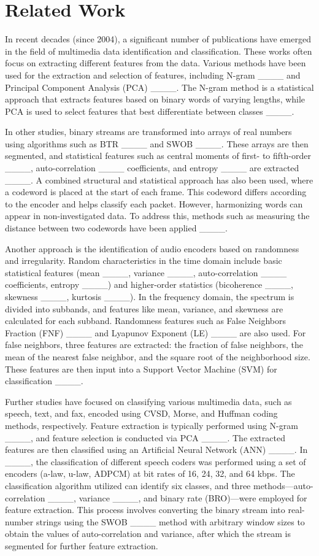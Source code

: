 \section{Related Work}
In recent decades (since 2004), a significant number of publications have emerged in the field of multimedia data identification and classification. These works often focus on extracting different features from the data. Various methods have been used for the extraction and selection of features, including N-gram ____ and Principal Component Analysis (PCA) ____. The N-gram method is a statistical approach that extracts features based on binary words of varying lengths, while PCA is used to select features that best differentiate between classes ____.

In other studies, binary streams are transformed into arrays of real numbers using algorithms such as BTR ____ and SWOB ____. These arrays are then segmented, and statistical features such as central moments of first- to fifth-order ____, auto-correlation ____ coefficients, and entropy ____ are extracted ____. A combined structural and statistical approach has also been used, where a codeword is placed at the start of each frame. This codeword differs according to the encoder and helps classify each packet. However, harmonizing words can appear in non-investigated data. To address this, methods such as measuring the distance between two codewords have been applied ____.

Another approach is the identification of audio encoders based on randomness and irregularity. Random characteristics in the time domain include basic statistical features (mean ____, variance ____, auto-correlation ____ coefficients, entropy ____) and higher-order statistics (bicoherence ____, skewness ____, kurtosis ____). In the frequency domain, the spectrum is divided into subbands, and features like mean, variance, and skewness are calculated for each subband. Randomness features such as False Neighbors Fraction (FNF) ____ and Lyapunov Exponent (LE) ____ are also used. For false neighbors, three features are extracted: the fraction of false neighbors, the mean of the nearest false neighbor, and the square root of the neighborhood size. These features are then input into a Support Vector Machine (SVM) for classification ____.

Further studies have focused on classifying various multimedia data, such as speech, text, and fax, encoded using CVSD, Morse, and Huffman coding methods, respectively. Feature extraction is typically performed using N-gram ____, and feature selection is conducted via PCA ____. The extracted features are then classified using an Artificial Neural Network (ANN) ____. In ____, the classification of different speech coders was performed using a set of encoders (a-law, u-law, ADPCM) at bit rates of 16, 24, 32, and 64 kbps. The classification algorithm utilized can identify six classes, and three methods—auto-correlation ____, variance ____, and binary rate (BRO)—were employed for feature extraction. This process involves converting the binary stream into real-number strings using the SWOB ____ method with arbitrary window sizes to obtain the values of auto-correlation and variance, after which the stream is segmented for further feature extraction.


